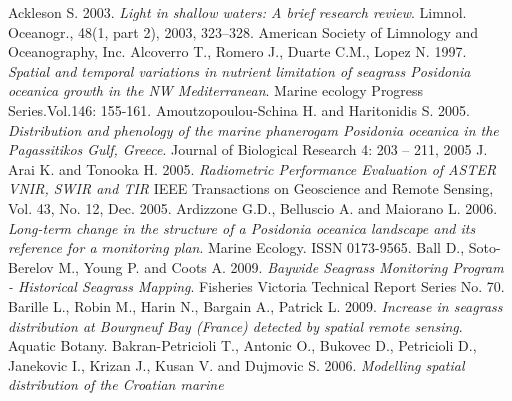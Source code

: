\documentclass[11pt]{article}
\begin{document}
\begin{thebibliography}{999}
\label{bib}


Ackleson S.\index[people]{} 2003. \emph{Light in shallow waters: A brief research review}. Limnol. Oceanogr.,
48(1, part 2), 2003, 323–328. American Society of Limnology and Oceanography, Inc. \pageref{Ackleson, 2003}
Alcoverro T., Romero J., Duarte C.M., Lopez N. 1997. \emph{Spatial and temporal variations
in nutrient limitation of seagrass \textit{Posidonia oceanica} growth in the NW Mediterranean}.
Marine ecology Progress Series.Vol.146: 155-161. \pageref{}
Amoutzopoulou-Schina H. and Haritonidis S. 2005. \emph{Distribution and phenology of the marine phanerogam \textit{Posidonia oceanica} in the Pagassitikos Gulf, Greece}. Journal of
Biological Research 4: 203 – 211, 2005 J. \pageref{Amoutzopoulou-Schina05}
Arai K. and Tonooka H. 2005. \emph{Radiometric Performance Evaluation of \ac{ASTER} VNIR, \ac{SWIR} and \ac{TIR}} 
IEEE Transactions on Geoscience and Remote Sensing, Vol. 43, No. 12, Dec. 2005. \pageref{Arai05}
Ardizzone G.D., Belluscio A. and Maiorano L. 2006. \emph{Long-term change in the structure of
a \textit{Posidonia oceanica} landscape and its reference for a monitoring plan}. Marine Ecology.
ISSN 0173-9565. \pageref{Ardizzone06}
Ball D., Soto-Berelov M., Young P. and Coots A. 2009. \emph{Baywide Seagrass Monitoring Program - Historical Seagrass Mapping}. Fisheries Victoria Technical Report Series No. 70. \pageref{Ball09}
Barille L., Robin M., Harin N., Bargain A., Patrick L. 2009. \emph{Increase in seagrass distribution at Bourgneuf Bay (France) detected by spatial remote sensing}. Aquatic Botany. \pageref{Barille09}
Bakran-Petricioli T., Antonic O., Bukovec D., Petricioli D., Janekovic I., Krizan J., Kusan V. and Dujmovic S. 2006. \emph{Modelling spatial distribution of the Croatian marine
}
\end{thebibliography}
\end{document}
